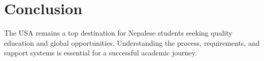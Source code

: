 \section{Conclusion}
The USA remains a top destination for Nepalese students seeking quality education and global opportunities. Understanding the process, requirements, and support systems is essential for a successful academic journey.
